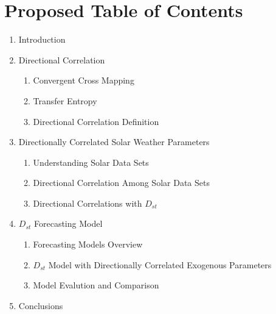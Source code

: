 \documentclass[letter,11pt]{article}
\begin{document}
\section*{Proposed Table of Contents}
\begin{enumerate}
\item Introduction
\item Directional Correlation
\begin{enumerate}
\item Convergent Cross Mapping
\item Transfer Entropy
\item Directional Correlation Definition
\end{enumerate}
\item Directionally Correlated Solar Weather Parameters
\begin{enumerate}
\item Understanding Solar Data Sets
\item Directional Correlation Among Solar Data Sets
\item Directional Correlations with $D_{st}$
\end{enumerate}
\item $D_{st}$ Forecasting Model
\begin{enumerate}
\item Forecasting Models Overview
\item $D_{st}$ Model with Directionally Correlated Exogenous Parameters
\item Model Evalution and Comparison
\end{enumerate}
\item Conclusions
\end{enumerate}
\end{document}
